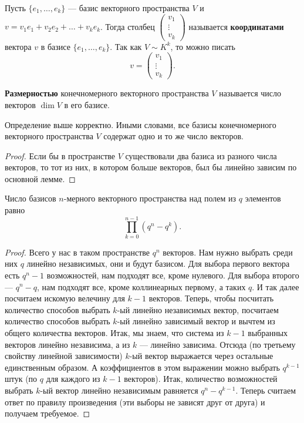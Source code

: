 \begin{definition}
    Пусть $\{e_1, \ldots, e_k\}$ --- базис векторного пространства $V$ и $v = v_1e_1 + v_2e_2 + \ldots + v_ke_k$. Тогда столбец
    $
    \begin{pmatrix}
        v_1\\
        \vdots\\
        v_k
    \end{pmatrix}
    $ называется \textbf{координатами} вектора $v$ в базисе $\{e_1, \ldots, e_k\}$. Так как $V \sim K^k$, то можно писать 
    $$
    v = 
    \begin{pmatrix}
        v_1\\
        \vdots\\
        v_k
    \end{pmatrix}.
    $$
\end{definition}

\begin{definition}
    \textbf{Размерностью} конечномерного векторного пространства $V$ называется число векторов $\dim V$ в его базисе.
\end{definition}

\begin{theorem}
    Определение выше корректно. Иными словами, все базисы конечномерного векторного пространства $V$ содержат одно и то же число векторов.
\end{theorem}

\begin{proof}
    Если бы в пространстве $V$ существовали два базиса из разного числа векторов, то тот из них, в котором больше векторов, был бы линейно зависим по основной лемме.
\end{proof}

\begin{statement}
    Число базисов $n$-мерного векторного пространства над полем из $q$ элементов равно
    $$
    \prod_{k = 0}^{n - 1}(q^n - q^k).
    $$
\end{statement}

\begin{proof}
    Всего у нас в таком пространстве $q^n$ векторов. Нам нужно выбрать среди них $q$ линейно независимых, они и будут базисом. Для выбора первого вектора есть $q^n - 1$ возможностей, нам подходят все, кроме нулевого. Для выбора второго --- $q^n - q$, нам подходят все, кроме коллинеарных первому, а таких $q$. И так далее посчитаем искомую велечину для $k - 1$ векторов. Теперь, чтобы посчитать количество способов выбрать $k$-ый линейно независимых вектор, посчитаем количество способов выбрать $k$-ый линейно зависимый вектор и вычтем из общего количества векторов. Итак, мы знаем, что система из $k - 1$ выбранных векторов линейно независима, а из $k$ --- линейно зависима. Отсюда (по третьему свойству линейной зависимости) $k$-ый вектор выражается через остальные единственным образом. А коэффициентов в этом выражении можно выбрать $q^{k - 1}$ штук (по $q$ для каждого из $k - 1$ векторов). Итак, количество возможностей выбрать $k$-ый вектор линейно независимым равняется $q^n - q^{k - 1}$. Теперь считаем ответ по правилу произведения (эти выборы не зависят друг от друга) и получаем требуемое.
\end{proof}

